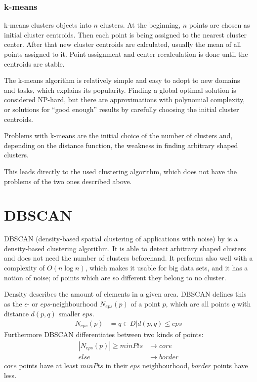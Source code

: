 \subsubsection*{k-means}
k-means clusters objects into $n$ clusters. At the beginning, $n$ points are chosen as initial cluster centroids. Then each point is being assigned to the nearest cluster center. After that new cluster centroids are calculated, usually the mean of all points assigned to it. Point assignment and center recalculation is done until the centroids are stable.

The k-means algorithm is relatively simple and easy to adopt to new domains and tasks, which explains its popularity. Finding a global optimal solution is considered NP-hard, but there are approximations with polynomial complexity, or solutions for \enquote{good enough} results by carefully choosing the initial cluster centroids.

Problems with k-means are the initial choice of the number of clusters and, depending on the distance function, the weakness in finding arbitrary shaped clusters.

\vspace{1em}
\noindent
This leads directly to the used clustering algorithm, which does not have the problems of the two ones described above.

\section{DBSCAN}
DBSCAN (density-based spatial clustering of applications with noise) by \textcite{Ester1996} is a density-based clustering algorithm. It is able to detect arbitrary shaped clusters and does not need the number of clusters beforehand. It performs also well with a complexity of $O(n \log n)$, which makes it usable for big data sets, and it has a notion of noise; of points which are so different they belong to no cluster.

Density describes the amount of elements in a given area. DBSCAN defines this as the $\epsilon$- or $eps$-neighbourhood $N_{eps}(p)$ of a point $p$, which are all points $q$ with distance $d(p, q)$ smaller $eps$.
%
\begin{align*}
N_{eps}(p) &= {q \in D | d(p,q) \leq eps}
\end{align*}
%
Furthermore DBSCAN differentiates between two kinds of points: 
%
\begin{align*}
|N_{eps}(p)| \geq minPts &\rightarrow core\\
else &\rightarrow border
\end{align*}
%
$core$ points have at least $minPts$ in their $eps$ neighbourhood, $border$ points have less.

